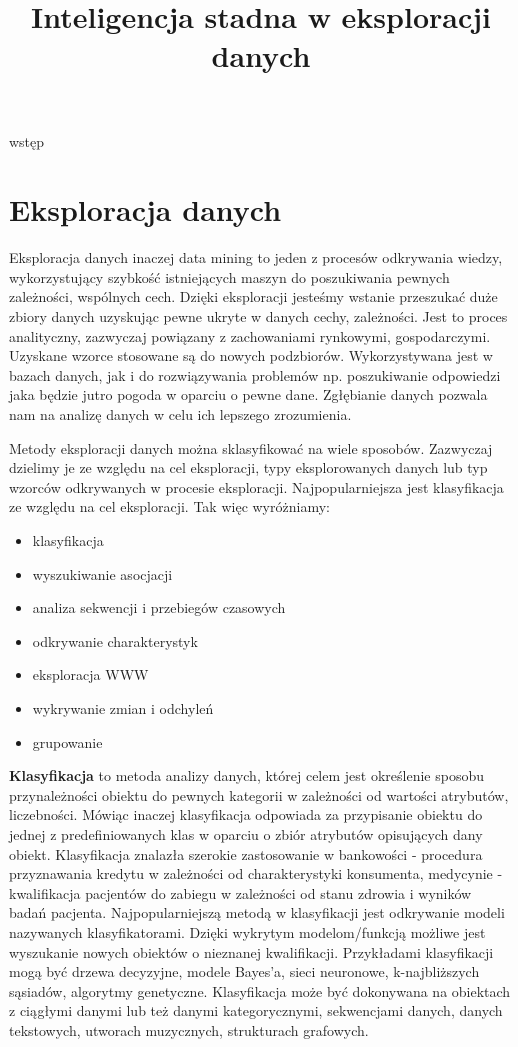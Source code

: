 \documentclass[twoside]{pracaMagisterskaMS}
\title{Inteligencja stadna w eksploracji danych}{}
\begin{document}
wstęp  

\section{Eksploracja danych}

Eksploracja danych inaczej data mining to jeden z procesów odkrywania wiedzy, wykorzystujący szybkość istniejących maszyn do poszukiwania pewnych zależności, wspólnych cech. Dzięki eksploracji jesteśmy wstanie przeszukać duże zbiory danych uzyskując pewne ukryte w danych cechy, zależności. Jest to proces analityczny, zazwyczaj powiązany z zachowaniami rynkowymi, gospodarczymi. Uzyskane wzorce stosowane są do nowych podzbiorów. Wykorzystywana jest w bazach danych, jak i do rozwiązywania problemów np. poszukiwanie odpowiedzi jaka będzie jutro pogoda  w oparciu o pewne dane. Zgłębianie danych pozwala nam na analizę danych w celu ich lepszego zrozumienia.

Metody eksploracji danych można sklasyfikować na wiele sposobów. Zazwyczaj dzielimy je ze względu na cel eksploracji, typy eksplorowanych danych lub typ wzorców odkrywanych w procesie eksploracji. Najpopularniejsza jest klasyfikacja ze względu na cel eksploracji. Tak więc wyróżniamy: 
	\begin{itemize}
	\item klasyfikacja	
	\item wyszukiwanie asocjacji
	\item analiza sekwencji i przebiegów czasowych
	\item odkrywanie charakterystyk
	\item eksploracja WWW
	\item wykrywanie zmian i odchyleń
	\item grupowanie
	\end{itemize} 
\newpage
\textbf{Klasyfikacja} to metoda analizy danych, której celem jest określenie sposobu przynależności obiektu do pewnych kategorii w zależności od wartości atrybutów, liczebności. Mówiąc inaczej klasyfikacja odpowiada za przypisanie obiektu do jednej z predefiniowanych klas w oparciu o zbiór atrybutów opisujących dany obiekt. Klasyfikacja znalazła szerokie zastosowanie w bankowości - procedura przyznawania kredytu w zależności od charakterystyki konsumenta, medycynie - kwalifikacja pacjentów do zabiegu w zależności od stanu zdrowia i wyników badań pacjenta. Najpopularniejszą metodą w klasyfikacji jest odkrywanie modeli nazywanych klasyfikatorami. Dzięki wykrytym modelom/funkcją możliwe jest wyszukanie nowych obiektów o nieznanej kwalifikacji. 
Przykładami klasyfikacji mogą być drzewa decyzyjne, modele Bayes'a, sieci neuronowe, k-najbliższych sąsiadów, algorytmy genetyczne. Klasyfikacja może być dokonywana na obiektach z ciągłymi danymi lub też danymi kategorycznymi, sekwencjami danych, danych tekstowych, utworach muzycznych, strukturach grafowych.
\end{document}
